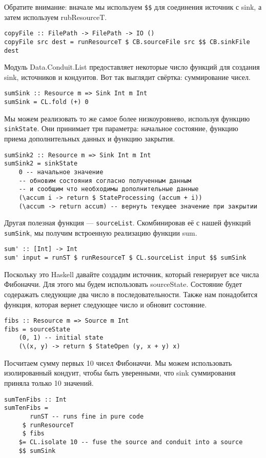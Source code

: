 Обратите внимание: вначале мы используем \verb=$$= для соединения источник с sink, а
затем используем rubResourceT.
\begin{lstlisting}
copyFile :: FilePath -> FilePath -> IO ()
copyFile src dest = runResourceT $ CB.sourceFile src $$ CB.sinkFile dest
\end{lstlisting}
Модуль Data.Conduit.List предоставляет некоторые число функций для создания sink,
источников и кондуитов. Вот так выглядит свёртка: суммирование чисел.
\begin{lstlisting}
sumSink :: Resource m => Sink Int m Int
sumSink = CL.fold (+) 0
\end{lstlisting}
Мы можем реализовать то же самое более низкоуровнево, используя функцию \verb=sinkState=.
Они принимает три параметра: начальное состояние, функцию приема дополнительных данных и
функцию закрытия.
\begin{lstlisting}
sumSink2 :: Resource m => Sink Int m Int
sumSink2 = sinkState
    0 -- начальное значение
    -- обновим состояния согласно полученным данным 
    -- и сообщим что необходимы дополнительные данные
    (\accum i -> return $ StateProcessing (accum + i))
    (\accum -> return accum) -- вернуть текущее значение при закрытии
\end{lstlisting}
Другая полезная функция --- \verb=sourceList=. Скомбинировав её с нашей функций
\verb=sumSink=, мы получим встроенную реализацию функции sum.
\begin{lstlisting}
sum' :: [Int] -> Int
sum' input = runST $ runResourceT $ CL.sourceList input $$ sumSink
\end{lstlisting}
Поскольку это Haskell давайте создадим источник, который генерирует все числа Фибоначчи.
Для этого мы будем использовать sourceState. Состояние будет содеражать следующие два
число в последовательности. Также нам понадобится функция, которая вернет следующее число
и обновит состояние.
\begin{lstlisting}fibs :: Resource m => Source m Int
fibs = sourceState
    (0, 1) -- initial state
    (\(x, y) -> return $ StateOpen (y, x + y) x)
\end{lstlisting}
Посчитаем сумму первых 10 чисел Фибоначчи. Мы можем использовать изолированный кондуит,
чтобы быть уверенными, что sink суммирования приняла только 10 значений.
\begin{lstlisting}sumTenFibs :: Int
sumTenFibs =
       runST -- runs fine in pure code
     $ runResourceT
     $ fibs
    $= CL.isolate 10 -- fuse the source and conduit into a source
    $$ sumSink
\end{lstlisting}
